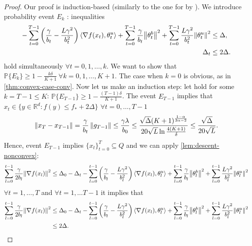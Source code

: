 \documentclass{article}
\begin{document}
\begin{proof}
    Our proof is induction-based (similarly to the one for  by \citet{sadiev2023high}). We introduce probability event $E_k$ : inequalities
    \begin{align*}
       - \sum\limits_{t=0}^{T-1}\left(\frac{\gamma}{b_t} - \frac{L\gamma^2}{b_t^2}\right)\left \langle \nabla f(x_t), \theta_t^u \right \rangle + \sum\limits_{t=0}^{T-1} \frac{\gamma}{b_t}{\left\lVert\theta_t^b\right\rVert}^2 + \sum\limits_{t=0}^{T-1}\frac{L\gamma^2}{b_t^2}{\left\lVert\theta_t^u\right\rVert}^2 &\leq \Delta,\\
        \Delta_t &\leq 2\Delta.
    \end{align*}
    hold simultaneously $\forall t = 0, 1, \ldots, k$. We want to show that $\mathbb{P}\{E_k\} \geq 1 - \frac{k\delta}{K+1} \ \forall k= 0, 1, \ldots, K+1$. The case when $k=0$ is obvious, as in \cref{thm:convex-case-conv}. Now let us make an induction step: let  hold for some $k = T-1 \leq K$: $\mathbb{P}\{E_{T-1}\} \geq 1 - \frac{(T-1)\delta}{K+1}$.  The event $E_{T-1}$ implies that $x_t \in \{y \in \mathbb{R}^d: f(y) \leq f_* + 2\Delta\}$  $\forall t = 0, \ldots, T-1$  
    \begin{align*}
        \left\lVert x_T - x_{T-1}\right\rVert = \frac{\gamma}{b_t}\left\lVert g_{T-1}\right\rVert \leq \frac{\gamma \lambda}{b_0} \leq \frac{\sqrt{\Delta}(K+1)^{\frac{1-\alpha}{3\alpha - 2}}}{20\sqrt{L} \ln\frac{4(K+1)}{\delta}} \leq \frac{\sqrt{\Delta}}{20\sqrt{L}}. 
    \end{align*}
    Hence, event $E_{T-1}$ implies $\{x_t\}_{t=0}^T \subseteq Q$ and we can apply \cref{lem:descent-nonconvex}:
    \begin{align*}
        \sum\limits_{l=0}^{t-1}\frac{\gamma}{2b_l}{\left\lVert\nabla f(x_l)\right\rVert}^2 \leq \Delta_0 - \Delta_t - \sum\limits_{l=0}^{t-1}\left(\frac{\gamma}{b_l} - \frac{L\gamma^2}{b_l^2}\right)\left \langle \nabla f(x_l), \theta_l^u \right \rangle + \sum\limits_{l=0}^{t-1} \frac{\gamma}{b_l}{\left\lVert\theta_l^b\right\rVert}^2 + \sum\limits_{l=0}^{t-1}\frac{L\gamma^2}{b_l^2}{\left\lVert\theta_l^u\right\rVert}^2
    \end{align*}
    $\forall t=1, \ldots, T$ and $\forall t=1, \ldots T-1$ it implies that
    \begin{align*}
       \sum\limits_{l=0}^{t-1}\frac{\gamma}{2b_l}\sqn{\nabla f(x_l)} &\leq \Delta_0 - \Delta_t - \sum\limits_{l=0}^{t-1}\left(\frac{\gamma}{b_l} - \frac{L\gamma^2}{b_l^2}\right)\ev{\nabla f(x_l), \theta_l^u} + \sum\limits_{l=0}^{t-1} \frac{\gamma}{b_l}\sqn{\theta_l^b} + \sum\limits_{l=0}^{t-1}\frac{L\gamma^2}{b_l^2}\sqn{\theta_l^u} \\&\leq 2\Delta.

\end{align*}
\end{proof}
\end{document}
